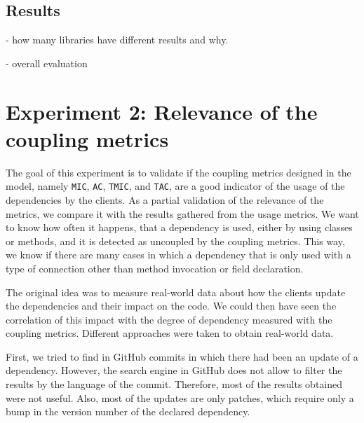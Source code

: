 \subsection{Results}

- how many libraries have different results and why.

- overall evaluation

\section{Experiment 2: Relevance of the coupling metrics}

The goal of this experiment is to validate if the coupling metrics designed in the model, namely \texttt{MIC}, \texttt{AC}, \texttt{TMIC}, and \texttt{TAC}, are a good indicator of the usage of the dependencies by the clients. As a partial validation of the relevance of the metrics, we compare it with the results gathered from the usage metrics. We want to know how often it happens, that a dependency is used, either by using classes or methods, and it is detected as uncoupled by the coupling metrics. This way, we know if there are many cases in which a dependency that is only used with a type of connection other than method invocation or field declaration.


The original idea was to measure real-world data about how the clients update the dependencies and their impact on the code. We could then have seen the correlation of this impact with the degree of dependency measured with the coupling metrics. Different approaches were taken to obtain real-world data.

First, we tried to find in GitHub commits in which there had been an update of a dependency. However, the search engine in GitHub does not allow to filter the results by the language of the commit. Therefore, most of the results obtained were not useful. Also, most of the updates are only patches, which require only a bump in the version number of the declared dependency.

